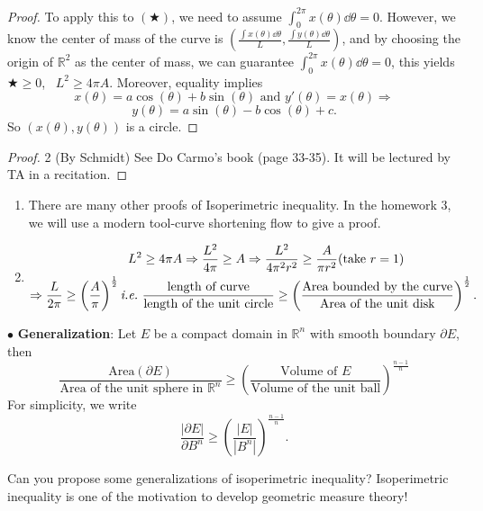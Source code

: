 \begin{proof}
    To apply this to $(\bigstar)$, we need to assume $\int_0^{2\pi}x(\theta)\dd \theta=0$. However, we know the center of mass of the curve is $\left(\frac{\int x(\theta)\dd \theta}{L},\frac{\int y(\theta)\dd \theta}{L}\right)$, and by choosing the origin of $\mathbb{R}^2$ as the center of mass, we can guarantee $\int_0^{2\pi}x(\theta)\dd \theta=0$, this yields $\bigstar\ge 0$, \ie\ $L^2\ge 4\pi A$. Moreover, equality implies
    \[x(\theta)=a\cos(\theta)+b\sin(\theta)\text{ and }y'(\theta)=x(\theta)\Rightarrow\]
    \[y(\theta)=a\sin(\theta)-b\cos(\theta)+c.\]
    So $(x(\theta),y(\theta))$ is a circle.
\end{proof}
\begin{proof}2 (By Schmidt)
    See Do Carmo's book (page 33-35). It will be lectured by TA in a recitation.
\end{proof}
\begin{remark}\hfill
    \begin{enumerate}[(1)]
        \item There are many other proofs of Isoperimetric
              inequality. In the homework 3, we will use a
              modern tool-curve shortening flow to give a proof.
        \item
              \begin{align*}
                  L^2                                                                                & \ge 4 \pi A  \Rightarrow \frac{L^2}{4\pi}\ge A \Rightarrow
                  \frac{L^2}{4\pi^2 r^2}\ge \frac{A}{\pi r^2}(\text{take }r=1)                                                                                    \\
                  \Rightarrow \frac{L}{2\pi}\ge \left(\frac{A}{\pi}\right)^{\frac{1}{2}}\text{\emph{i.e.}\ } &
                  \frac{\text{length of curve}}{\text{length of the unit circle}}
                  \ge \left(\frac{\text{Area bounded by the curve}}{\text{Area of the unit disk}}\right)^{\frac{1}{2}}
                  .\end{align*}
    \end{enumerate}
\end{remark}
$\bullet$ \textbf{Generalization}: Let $E$ be a compact domain in $\mathbb{R}^n$ with smooth boundary $\partial E$, then
\[
    \frac{\text{Area}(\partial E)}{\text{Area of the unit sphere in }\mathbb
        {R}^n}\ge \left(\frac{\text{Volume of }E}{\text{Volume of the unit
            ball}}\right)^{\frac{n-1}{n}}
\]
For simplicity, we write
\[
    \frac{|\partial E|}{\partial B^n} \ge \left(\frac{|E|}{|B^n|}\right)^
    {\frac{n-1}{n}}.
\]
\begin{question}
    Can you propose some generalizations of isoperimetric inequality?
    Isoperimetric inequality is one of the motivation to develop geometric measure theory!
\end{question}
